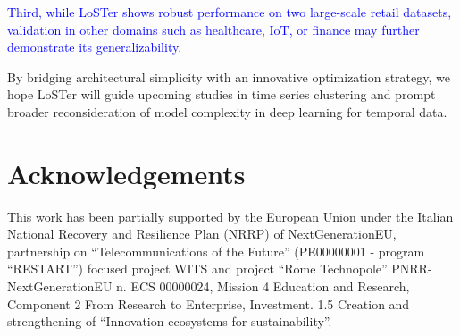 \documentclass[times, review, 10pt]{elsarticle}
\begin{document}
\textcolor{blue}{Third, while LoSTer shows robust performance on two large-scale retail datasets, validation in other domains such as healthcare, IoT, or finance may further demonstrate its generalizability.}

By bridging architectural simplicity with an innovative optimization strategy, we hope LoSTer will guide upcoming studies in time series clustering and prompt broader reconsideration of model complexity in deep learning for temporal data.

\section*{Acknowledgements}
This work has been partially supported by the European Union under the Italian National Recovery and Resilience Plan (NRRP) of NextGenerationEU, partnership on “Telecommunications of the Future” (PE00000001 - program “RESTART”) focused project WITS and project “Rome Technopole” PNRR-NextGenerationEU n. ECS 00000024, Mission 4 Education and Research, Component 2 From Research to Enterprise, Investment. 1.5 Creation and strengthening of “Innovation ecosystems for sustainability”.




\end{document}
